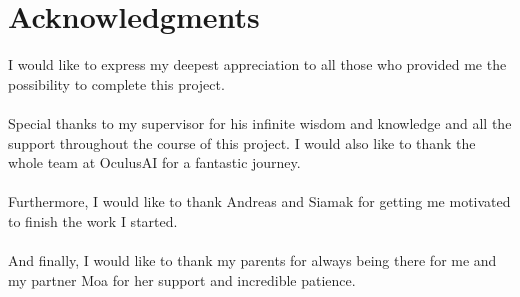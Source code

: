 
\clearpage
\thispagestyle{empty}
\chapter*{Acknowledgments}

I would like to express my deepest appreciation to all those who provided me the possibility to complete this project.
\\
\\
Special thanks to my supervisor for his infinite wisdom and knowledge and all the support throughout the course of this project. I would also like to thank the whole team at OculusAI for a fantastic journey.
\\
\\
Furthermore, I would like to thank Andreas and Siamak for getting me motivated to finish the work I started.
\\
\\
And finally, I would like to thank my parents for always being there for me and my partner Moa for her support and incredible patience.
\clearpage

